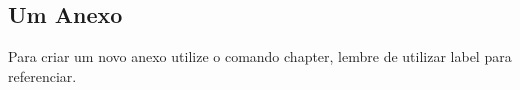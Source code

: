 \begin{anexosenv}
  \partanexos %

  \chapter{Um Anexo}
  \label{ape:anexoI}
  Para criar um novo anexo utilize o comando chapter, lembre de utilizar label para referenciar.

\end{anexosenv}
